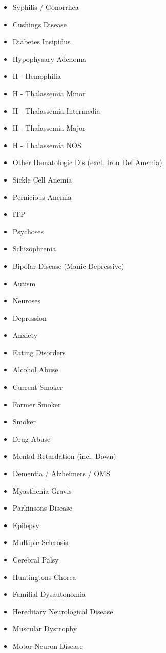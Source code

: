 \documentclass[a4paper,12pt]{article}
\begin{document}
\begin{appendices}
\begin{itemize}
   			\item Syphilis / Gonorrhea
   			\item Cushings Disease
   			\item Diabetes Insipidus
   			\item Hypophysary Adenoma
   			\item H - Hemophilia
   			\item H - Thalassemia Minor
   			\item H - Thalassemia Intermedia
   			\item H - Thalassemia Major
   			\item H - Thalassemia NOS
   			\item Other Hematologic Dis (excl. Iron Def Anemia)
   			\item Sickle Cell Anemia
   			\item Pernicious Anemia
   			\item ITP
   			\item Psychoses
   			\item Schizophrenia
   			\item Bipolar Disease (Manic Depressive)
   			\item Autism
   			\item Neuroses
   			\item Depression
   			\item Anxiety
   			\item Eating Disorders
   			\item Alcohol Abuse
   			\item Current Smoker
   			\item Former Smoker
   			\item Smoker
   			\item Drug Abuse
   			\item Mental Retardation (incl. Down)
   			\item Dementia / Alzheimers / OMS
   			\item Myasthenia Gravis
   			\item Parkinsons Disease
   			\item Epilepsy
   			\item Multiple Sclerosis
   			\item Cerebral Palsy
   			\item Huntingtons Chorea
   			\item Familial Dysautonomia
   			\item Hereditary Neurological Disease
   			\item Muscular Dystrophy
   			\item Motor Neuron Disease

\end{itemize}
\end{appendices}
\end{document}
